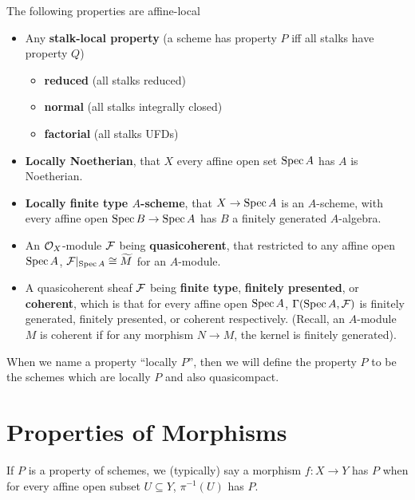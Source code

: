 \documentclass[12pt]{article}
\begin{document}
\begin{eg}
    The following properties are affine-local
    \begin{itemize}
        \item Any \textbf{stalk-local property} (a scheme has property $P$ iff all stalks have property $Q$)
        \begin{itemize}
            \item \textbf{reduced} (all stalks reduced)
            \item \textbf{normal} (all stalks integrally closed)
            \item \textbf{factorial} (all stalks UFDs)
        \end{itemize}
        \item \textbf{Locally Noetherian}, that $X$ every affine open set $\operatorname{Spec} A$ has $A$ is Noetherian.
        \item \textbf{Locally finite type $A$-scheme}, that $X\to \operatorname{Spec} A$ is an $A$-scheme, with every affine open $\operatorname{Spec} B \to \operatorname{Spec} A$ has $B$ a finitely generated $A$-algebra.
        \item An $\mathcal{O}_X$-module $\mathcal{F}$ being \textbf{quasicoherent}, that restricted to any affine open $\operatorname{Spec} A$, $\mathcal{F}|_{\operatorname{Spec} A} \cong \widetilde{M}$ for an $A$-module.
        \item A quasicoherent sheaf $\mathcal{F}$ being \textbf{finite type}, \textbf{finitely presented}, or \textbf{coherent}, which is that for every affine open $\operatorname{Spec} A$, $\Gamma(\operatorname{Spec} A,\mathcal{F})$ is finitely generated, finitely presented, or coherent respectively. (Recall, an $A$-module $M$ is coherent if for any morphism $N\to M$, the kernel is finitely generated).
    \end{itemize}
\end{eg}

\begin{defn}
    When we name a property ``locally $P$'', then we will define the property $P$ to be the schemes which are locally $P$ and also quasicompact.
\end{defn}


\section{Properties of Morphisms}

\begin{defn}
    If $P$ is a property of schemes, we (typically) say a morphism $f:X\to Y$ has $P$ when for every affine open subset $U\subseteq Y$, $\pi^{-1}(U)$ has $P$.
\end{defn}
\end{document}
